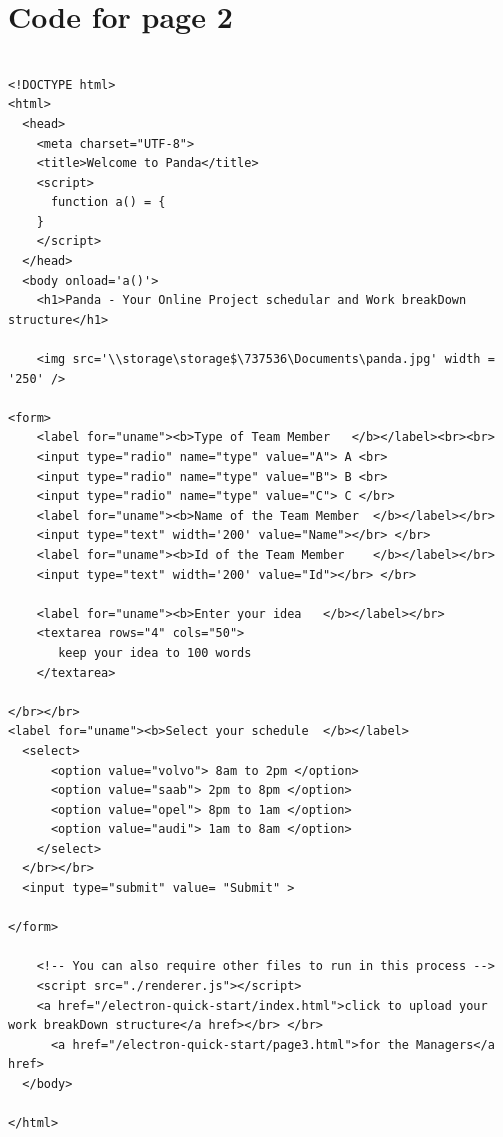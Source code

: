 \documentclass{article}
\begin{document}
\section *{Code for page 2}
\begin{verbatim}

<!DOCTYPE html>
<html>
  <head>
    <meta charset="UTF-8">
    <title>Welcome to Panda</title>
    <script>
      function a() = {
    }
    </script>
  </head>
  <body onload='a()'>
    <h1>Panda - Your Online Project schedular and Work breakDown structure</h1>
    
    <img src='\\storage\storage$\737536\Documents\panda.jpg' width = '250' />
    
<form>
    <label for="uname"><b>Type of Team Member   </b></label><br><br>
    <input type="radio" name="type" value="A"> A <br>
    <input type="radio" name="type" value="B"> B <br>
    <input type="radio" name="type" value="C"> C </br>
    <label for="uname"><b>Name of the Team Member  </b></label></br>
    <input type="text" width='200' value="Name"></br> </br>
    <label for="uname"><b>Id of the Team Member    </b></label></br>
    <input type="text" width='200' value="Id"></br> </br>

    <label for="uname"><b>Enter your idea   </b></label></br>
    <textarea rows="4" cols="50">
       keep your idea to 100 words
    </textarea>
 
</br></br>
<label for="uname"><b>Select your schedule  </b></label>
  <select>
      <option value="volvo"> 8am to 2pm </option>
      <option value="saab"> 2pm to 8pm </option>
      <option value="opel"> 8pm to 1am </option>
      <option value="audi"> 1am to 8am </option>
    </select>
  </br></br>
  <input type="submit" value= "Submit" >
  
</form>

    <!-- You can also require other files to run in this process -->
    <script src="./renderer.js"></script>
    <a href="/electron-quick-start/index.html">click to upload your work breakDown structure</a href></br> </br>
      <a href="/electron-quick-start/page3.html">for the Managers</a href>
  </body>
  
</html>




\end{verbatim}
\end{document}
